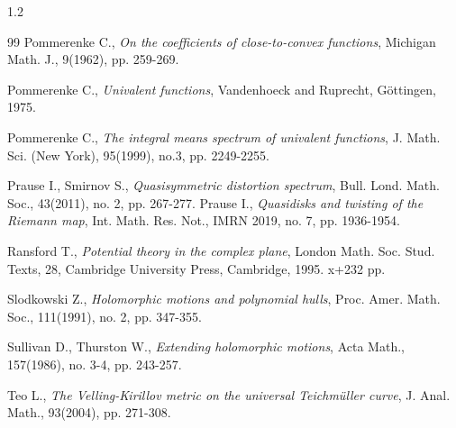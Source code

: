 \documentclass[11pt]{amsart}
\theoremstyle{remark}
\theoremstyle{claim}
\theoremstyle{definition}
\theoremstyle{problem}
\theoremstyle{conjecture}
\theoremstyle{question}
\numberwithin{equation}{section}
\begin{document}
\begin{spacing}{1.2}
\begin{thebibliography}{99}
Pommerenke C., {\em On the coefficients of close-to-convex functions}, Michigan Math. J.,  9(1962), pp. 259-269.

Pommerenke C., {\em Univalent functions}, Vandenhoeck and Ruprecht, G\"ottingen, 1975.


Pommerenke C., {\em The integral means spectrum of univalent functions},  J. Math. Sci. (New York), 95(1999), no.3, pp. 2249-2255.

Prause I., Smirnov S., {\em Quasisymmetric distortion spectrum}, Bull. Lond. Math. Soc., 
43(2011), no. 2, pp. 267-277.
Prause I., {\em Quasidisks and twisting of the Riemann map}, Int. Math. Res. Not., IMRN 2019, no. 7, pp. 1936-1954.

Ransford T., {\em Potential theory in the complex plane}, London Math. Soc.  Stud. Texts, 28, Cambridge University Press, Cambridge, 1995. x+232 pp.





Slodkowski Z., {\em Holomorphic motions and polynomial hulls},  Proc. Amer. Math. Soc., 
111(1991), no. 2, pp. 347-355.

Sullivan D.,  Thurston W., {\em Extending holomorphic motions}, Acta Math., 157(1986), no. 3-4, pp. 243-257.

Teo L., {\em The Velling-Kirillov metric on the universal Teichm\"uller curve}, J. Anal. Math.,  93(2004), pp. 271-308.



\end{thebibliography}
\end{spacing}
\end{document}
